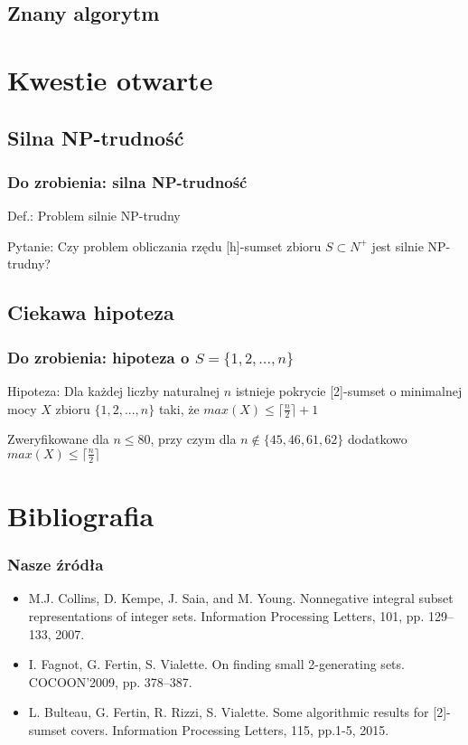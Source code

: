 \documentclass{beamer}
\begin{document}
	\subsection{Znany algorytm}
		\begin{frame}
		\end{frame}
		
\section{Kwestie otwarte}
	\subsection{Silna NP-trudność}
		\begin{frame} \frametitle{Do zrobienia: silna NP-trudność}
			Def.: Problem silnie NP-trudny
			
			Pytanie: Czy problem obliczania rzędu [h]-sumset zbioru $ S \subset N^{+} $ jest silnie NP-trudny?
		\end{frame}
		
	\subsection{Ciekawa hipoteza}
		\begin{frame} \frametitle{Do zrobienia: hipoteza o $ S = \lbrace 1,2,...,n \rbrace $}
			Hipoteza: Dla każdej liczby naturalnej $ n $ istnieje pokrycie [2]-sumset o minimalnej mocy $ X $ zbioru $ \lbrace 1,2,...,n \rbrace $ taki, że $ max(X) \leq \lceil \frac{n}{2} \rceil + 1 $
			
			Zweryfikowane dla $ n \leq 80 $, przy czym dla $ n \notin \lbrace 45,46,61,62 \rbrace $ dodatkowo $ max(X) \leq \lceil \frac{n}{2} \rceil $
		\end{frame}

\section{Bibliografia}
	\begin{frame} \frametitle{Nasze źródła}
		\begin{itemize}
			\item M.J. Collins, D. Kempe, J. Saia, and M. Young. Nonnegative integral
subset representations of integer sets. Information Processing Letters, 101, pp. 129–133, 2007.
			\item I. Fagnot, G. Fertin, S. Vialette. On finding small 2-generating sets. COCOON'2009, pp. 378–387.
			\item L. Bulteau, G. Fertin, R. Rizzi, S. Vialette. Some algorithmic results
for [2]-sumset covers. Information Processing Letters, 115, pp.1-5, 2015.
		\end{itemize}
	\end{frame}
	
\end{document}
